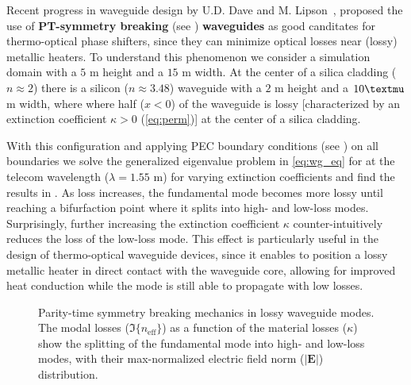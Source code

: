 Recent progress in waveguide design by U.D. Dave and M. Lipson~\cite{lipson}, proposed the use of \textbf{PT-symmetry breaking} (see ) \textbf{waveguides} as good canditates for
thermo-optical phase shifters, since they can minimize optical losses near (lossy) metallic heaters. To understand this phenomenon we consider a simulation domain with a $5$ \textmu m height and a $15$ \textmu m width. At the center of a silica cladding ($n\approx 2$) there is a silicon ($n \approx 3.48$) waveguide with a $2$ \textmu m height and a $10 \textmu$ m width, where where half ($x<0$) of the waveguide is lossy [characterized by an extinction coefficient $\kappa>0$ (\eqref{eq:perm})]  at the center of a silica cladding.

With this configuration and applying PEC boundary conditions (see ) on all boundaries we solve the generalized eigenvalue problem in \eqref{eq:wg_eq} for at the telecom wavelength ($\lambda=1.55$ \textmu m) for varying extinction coefficients and find the results in .
As loss increases, the fundamental mode becomes more lossy until reaching a 
bifurfaction point where it splits into high- and low-loss modes. Surprisingly, further increasing the extinction coefficient $\kappa$ counter-intuitively reduces the loss of the low-loss mode. This effect is particularly useful in the design of
thermo-optical waveguide devices, since it enables to position a lossy metallic heater in direct contact with the waveguide core, allowing for improved heat conduction while the mode is still able to propagate with low losses.

\begin{figure}[tb]
    \centering
    \caption{Parity-time symmetry breaking mechanics in lossy waveguide modes. The modal losses ($\Im\{n_\text{eff}\}$) as a function of the material losses ($\kappa$) show the splitting of the fundamental mode into 
    high- and low-loss modes, with their max-normalized electric field norm ($\vert \mathbf{E} \vert$) distribution.}
    \label{fig:pt}
\end{figure}

